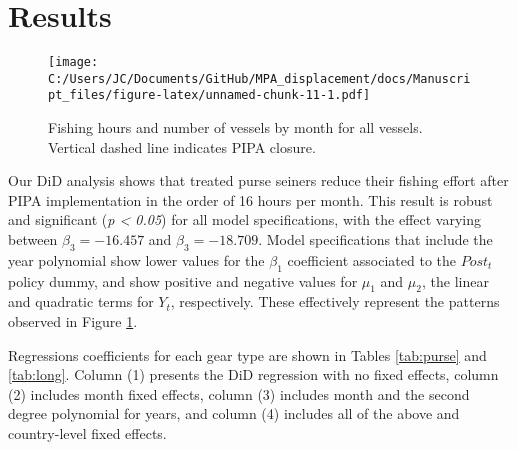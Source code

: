 \documentclass[11pt,]{article}
\begin{document}
\clearpage

\hypertarget{results}{%
\section{Results}\label{results}}

\begin{figure}
\centering
\texttt{[image: C:/Users/JC/Documents/GitHub/MPA\_displacement/docs/Manuscript\_files/figure-latex/unnamed-chunk-11-1.pdf]}
\caption{\label{fig:unnamed-chunk-11}\label{fig:all_vessels}Fishing hours
and number of vessels by month for all vessels. Vertical dashed line
indicates PIPA closure.}
\end{figure}

Our DiD analysis shows that treated purse seiners reduce their fishing
effort after PIPA implementation in the order of 16 hours per month.
This result is robust and significant (\emph{p \textless{} 0.05}) for
all model specifications, with the effect varying between
\(\beta_3 = -16.457\) and \(\beta_3 = -18.709\). Model specifications
that include the year polynomial show lower values for the \(\beta_1\)
coefficient associated to the \(Post_t\) policy dummy, and show positive
and negative values for \(\mu_1\) and \(\mu_2\), the linear and
quadratic terms for \(Y_t\), respectively. These effectively represent
the patterns observed in Figure \ref{fig:all_vessels}.

Regressions coefficients for each gear type are shown in Tables
\ref{tab:purse} and \ref{tab:long}. Column (1) presents the DiD
regression with no fixed effects, column (2) includes month fixed
effects, column (3) includes month and the second degree polynomial for
years, and column (4) includes all of the above and country-level fixed
effects.
\end{document}
